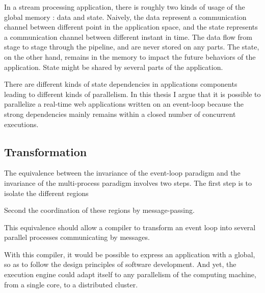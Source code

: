 In a stream processing application, there is roughly two kinds of usage of the global memory : data and state.
Naively, the data represent a communication channel between different point in the application space, and the state represents a communication channel between different instant in time.
The data flow from stage to stage through the pipeline, and are never stored on any parts.
The state, on the other hand, remains in the memory to impact the future behaviors of the application.
State might be shared by several parts of the application.

There are different kinds of state dependencies in applications components leading to different kinds of parallelism.
In this thesis I argue that it is possible to parallelize a real-time web applications written on an event-loop because the strong dependencies mainly remains within a closed number of concurrent executions.

\subsection{Transformation}

The equivalence between the invariance of the event-loop paradigm and the invariance of the multi-process paradigm involves two steps.
The first step is to isolate the different regions 


Second the coordination of these regions by message-passing.








This equivalence should allow a compiler to transform an event loop into several parallel processes communicating by messages.

With this compiler, it would be possible to express an application with a global, so as to follow the design principles of software development.
And yet, the execution engine could adapt itself to any parallelism of the computing machine, from a single core, to a distributed cluster.










\endinput


We translate the definition of the invariance in time by an invariance in space.



